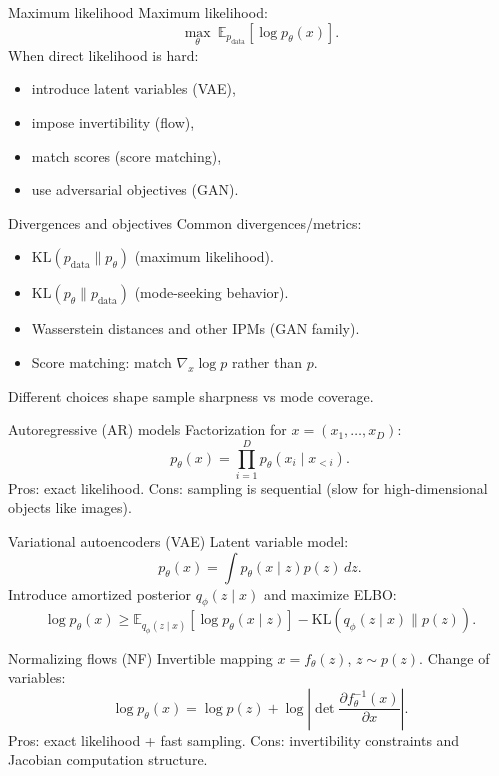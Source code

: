 \documentclass[aspectratio=169]{beamer}
\begin{document}
\begin{frame}{Maximum likelihood}
Maximum likelihood:
\[
\max_\theta \ \mathbb{E}_{p_{\text{data}}}[\log p_\theta(x)].
\]
When direct likelihood is hard:
\begin{itemize}
\item introduce latent variables (VAE),
\item impose invertibility (flow),
\item match scores (score matching),
\item use adversarial objectives (GAN).
\end{itemize}
\end{frame}

\begin{frame}{Divergences and objectives}
Common divergences/metrics:
\begin{itemize}
\item \(\mathrm{KL}(p_{\text{data}}\|p_\theta)\) (maximum likelihood).
\item \(\mathrm{KL}(p_\theta\|p_{\text{data}})\) (mode-seeking behavior).
\item Wasserstein distances and other IPMs (GAN family).
\item Score matching: match \(\nabla_x \log p\) rather than \(p\).
\end{itemize}
Different choices shape sample sharpness vs mode coverage.
\end{frame}

\begin{frame}{Autoregressive (AR) models}
Factorization for \(x=(x_1,\dots,x_D)\):
\[
p_\theta(x)=\prod_{i=1}^D p_\theta(x_i\mid x_{<i}).
\]
Pros: exact likelihood.
Cons: sampling is sequential (slow for high-dimensional objects like images).
\end{frame}

\begin{frame}{Variational autoencoders (VAE)}
Latent variable model:
\[
p_\theta(x)=\int p_\theta(x\mid z)p(z)\,dz.
\]
Introduce amortized posterior \(q_\phi(z\mid x)\) and maximize ELBO:
\[
\log p_\theta(x)\ge \mathbb{E}_{q_\phi(z\mid x)}[\log p_\theta(x\mid z)]-\mathrm{KL}(q_\phi(z\mid x)\|p(z)).
\]
\end{frame}

\begin{frame}{Normalizing flows (NF)}
Invertible mapping \(x=f_\theta(z)\), \(z\sim p(z)\).
Change of variables:
\[
\log p_\theta(x)=\log p(z)+\log\left|\det \frac{\partial f_\theta^{-1}(x)}{\partial x}\right|.
\]
Pros: exact likelihood + fast sampling.
Cons: invertibility constraints and Jacobian computation structure.
\end{frame}
\end{document}
